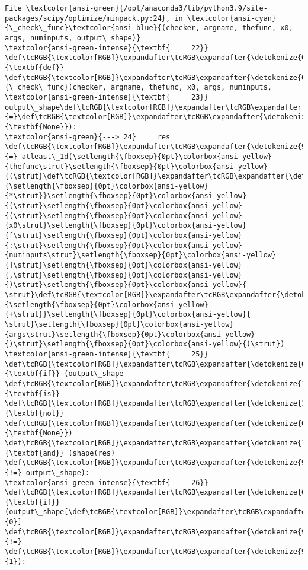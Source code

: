 \documentclass[11pt]{article}
\begin{document}
\begin{Verbatim}[commandchars=\\\{\}, frame=single, framerule=2mm, rulecolor=\color{outerrorbackground}]
File \textcolor{ansi-green}{/opt/anaconda3/lib/python3.9/site-packages/scipy/optimize/minpack.py:24}, in \textcolor{ansi-cyan}{\_check\_func}\textcolor{ansi-blue}{(checker, argname, thefunc, x0, args, numinputs, output\_shape)}
\textcolor{ansi-green-intense}{\textbf{     22}} \def\tcRGB{\textcolor[RGB]}\expandafter\tcRGB\expandafter{\detokenize{0,135,0}}{\textbf{def}} \def\tcRGB{\textcolor[RGB]}\expandafter\tcRGB\expandafter{\detokenize{0,0,255}}{\_check\_func}(checker, argname, thefunc, x0, args, numinputs,
\textcolor{ansi-green-intense}{\textbf{     23}}                 output\_shape\def\tcRGB{\textcolor[RGB]}\expandafter\tcRGB\expandafter{\detokenize{98,98,98}}{=}\def\tcRGB{\textcolor[RGB]}\expandafter\tcRGB\expandafter{\detokenize{0,135,0}}{\textbf{None}}):
\textcolor{ansi-green}{---> 24}     res \def\tcRGB{\textcolor[RGB]}\expandafter\tcRGB\expandafter{\detokenize{98,98,98}}{=} atleast\_1d(\setlength{\fboxsep}{0pt}\colorbox{ansi-yellow}{thefunc\strut}\setlength{\fboxsep}{0pt}\colorbox{ansi-yellow}{(\strut}\def\tcRGB{\textcolor[RGB]}\expandafter\tcRGB\expandafter{\detokenize{98,98,98}}{\setlength{\fboxsep}{0pt}\colorbox{ansi-yellow}{*\strut}}\setlength{\fboxsep}{0pt}\colorbox{ansi-yellow}{(\strut}\setlength{\fboxsep}{0pt}\colorbox{ansi-yellow}{(\strut}\setlength{\fboxsep}{0pt}\colorbox{ansi-yellow}{x0\strut}\setlength{\fboxsep}{0pt}\colorbox{ansi-yellow}{[\strut}\setlength{\fboxsep}{0pt}\colorbox{ansi-yellow}{:\strut}\setlength{\fboxsep}{0pt}\colorbox{ansi-yellow}{numinputs\strut}\setlength{\fboxsep}{0pt}\colorbox{ansi-yellow}{]\strut}\setlength{\fboxsep}{0pt}\colorbox{ansi-yellow}{,\strut}\setlength{\fboxsep}{0pt}\colorbox{ansi-yellow}{)\strut}\setlength{\fboxsep}{0pt}\colorbox{ansi-yellow}{ \strut}\def\tcRGB{\textcolor[RGB]}\expandafter\tcRGB\expandafter{\detokenize{98,98,98}}{\setlength{\fboxsep}{0pt}\colorbox{ansi-yellow}{+\strut}}\setlength{\fboxsep}{0pt}\colorbox{ansi-yellow}{ \strut}\setlength{\fboxsep}{0pt}\colorbox{ansi-yellow}{args\strut}\setlength{\fboxsep}{0pt}\colorbox{ansi-yellow}{)\strut}\setlength{\fboxsep}{0pt}\colorbox{ansi-yellow}{)\strut})
\textcolor{ansi-green-intense}{\textbf{     25}}     \def\tcRGB{\textcolor[RGB]}\expandafter\tcRGB\expandafter{\detokenize{0,135,0}}{\textbf{if}} (output\_shape \def\tcRGB{\textcolor[RGB]}\expandafter\tcRGB\expandafter{\detokenize{175,0,255}}{\textbf{is}} \def\tcRGB{\textcolor[RGB]}\expandafter\tcRGB\expandafter{\detokenize{175,0,255}}{\textbf{not}} \def\tcRGB{\textcolor[RGB]}\expandafter\tcRGB\expandafter{\detokenize{0,135,0}}{\textbf{None}}) \def\tcRGB{\textcolor[RGB]}\expandafter\tcRGB\expandafter{\detokenize{175,0,255}}{\textbf{and}} (shape(res) \def\tcRGB{\textcolor[RGB]}\expandafter\tcRGB\expandafter{\detokenize{98,98,98}}{!=} output\_shape):
\textcolor{ansi-green-intense}{\textbf{     26}}         \def\tcRGB{\textcolor[RGB]}\expandafter\tcRGB\expandafter{\detokenize{0,135,0}}{\textbf{if}} (output\_shape[\def\tcRGB{\textcolor[RGB]}\expandafter\tcRGB\expandafter{\detokenize{98,98,98}}{0}] \def\tcRGB{\textcolor[RGB]}\expandafter\tcRGB\expandafter{\detokenize{98,98,98}}{!=} \def\tcRGB{\textcolor[RGB]}\expandafter\tcRGB\expandafter{\detokenize{98,98,98}}{1}):


\end{Verbatim}
\end{document}
